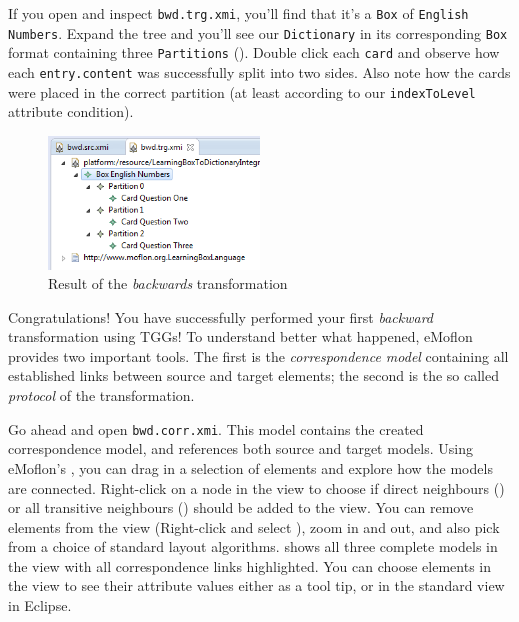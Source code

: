 \begin{stepbystep}
\item If you open and inspect \texttt{bwd.trg.xmi}, you'll find that it's a \texttt{Box} of \texttt{English Numbers}.
Expand the tree and you'll see our \texttt{Dictionary} in its corresponding
\texttt{Box} format containing three \texttt{Par\-ti\-tions} (). 
Double click each \texttt{card} and observe how each \texttt{entry.content} was successfully split into two sides.
Also note how the cards were placed in the correct partition (at least according to our \texttt{indexToLevel} attribute condition).

\begin{figure}[htbp]
\begin{center}
  \includegraphics[width=0.5\textwidth]{../../org.moflon.doc.handbook.04_tripleGraphTransformations/5_inAction/aImages/eclipse_derivedSource}
  \caption{Result of the \emph{backwards} transformation}
  \label{eclipse:derivedBOX}
\end{center}
\end{figure}

\item
Congratulations!
You have successfully performed your first \emph{backward} transformation using TGGs!
To understand better what happened, eMoflon provides two important tools.
The first is the \emph{correspondence model} containing all established links between source and target elements;
the second is the so called \emph{protocol} of the transformation. 

\item Go ahead and open \texttt{bwd.corr.xmi}.
This model contains the created correspondence model, and references both source and target models.
Using eMoflon's , you can drag in a selection of elements and explore how the models are connected.
Right-click on a node in the view to choose if direct neighbours () or all transitive neighbours (\menuPath{\lstinline|-(*)->|}) should be added to the view.
You can remove elements from the view (Right-click and select ), zoom in and out, and also pick from a choice of standard layout algorithms.
 shows all three complete models in the view with all correspondence links highlighted. 
You can choose elements in the view to see their attribute values either as a tool tip, or in the standard  view in Eclipse.


\end{stepbystep}
